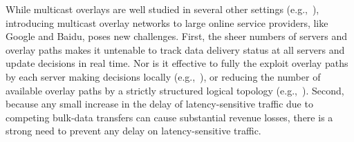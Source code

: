 While multicast overlays are well studied in several other settings
(e.g.,~\cite{??,??,??,??}), introducing multicast overlay networks 
to large online  service providers, 
like Google and Baidu, poses new challenges.
First, the sheer numbers of servers and overlay paths makes
it untenable to track data delivery status at all servers and 
update decisions in real time. 
Nor is it effective to fully the exploit 
overlay paths by each server making decisions locally
(e.g.,~\cite{kostic2003bullet,Repantis2010Scaling}), 
or reducing the number of available overlay paths by a 
strictly structured logical topology 
(e.g.,~\cite{Nygren2010The}).
Second, because any small increase in the delay of
latency-sensitive traffic due to competing bulk-data transfers
 can cause substantial revenue losses, 
there is a strong need to prevent any delay on
latency-sensitive traffic.




